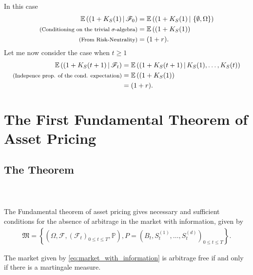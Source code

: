 \documentclass{beamer}
\numberwithin{equation}{section}
\begin{document}
\begin{frame}\frametitle{{\normalsize \secname} \\ {\large \subsecname}}
    \begingroup
    \footnotesize
    In this case
    \begin{align}
        \mathbb{E}\left((1 + K_S(1)\,|\,\mathscr{F}_0\right) &= \mathbb{E}\left((1 + K_S(1)\,|\,\left\{\emptyset, \Omega\right\}\right) \\
        \text{{\footnotesize (Conditioning on the trivial $\sigma$-algebra)}} &= \mathbb{E}\left((1 + K_S(1)\right) \\
        \text{{\footnotesize (From Risk-Neutrality)}}&= (1 + r).
    \end{align}
    Let me now consider the case when $t \geq 1$
    \begin{align}
        \mathbb{E}\left((1 + K_S(t + 1)\,|\,\mathscr{F}_t\right) &= \mathbb{E}\left((1 + K_S(t + 1)\,|\,K_S(1),\ldots,K_S(t)\right) \\
        \text{{\footnotesize (Indepence prop. of the cond. expectation)}} &= \mathbb{E}\left((1 + K_S(1)\right) \\
        &= (1 + r).
    \end{align}
    \endgroup
\end{frame}

\section{The First Fundamental Theorem of Asset Pricing}

\subsection{The Theorem}

\begin{frame}\frametitle{{\normalsize \secname} \\ {\large \subsecname}}
    The Fundamental theorem of asset pricing gives necessary and sufficient conditions for the absence of arbitrage in the market with information, given by
    \begingroup
    \footnotesize
    \begin{align}\label{eq:market_with_information}
        \mathfrak{M} =
        \left\{
            \left(
                \Omega, 
                \mathscr{F}, 
                \left(
                    \mathscr{F}_t
                \right)_{0 \leq t \leq T},
                \mathbb{P}
            \right),
            P =
            \left(
                B_t,
                S_t^{(1)},
                \ldots,
                S_t^{(d)}
            \right)_{0 \leq t \leq T}
        \right\}.
    \end{align}
    \endgroup

    \begin{theorem}[FFTAP]\label{th:fftap}
        The market given by \eqref{eq:market_with_information} is arbitrage free if and only if there is a martingale measure. 
    \end{theorem}
\end{frame}
\end{document}
